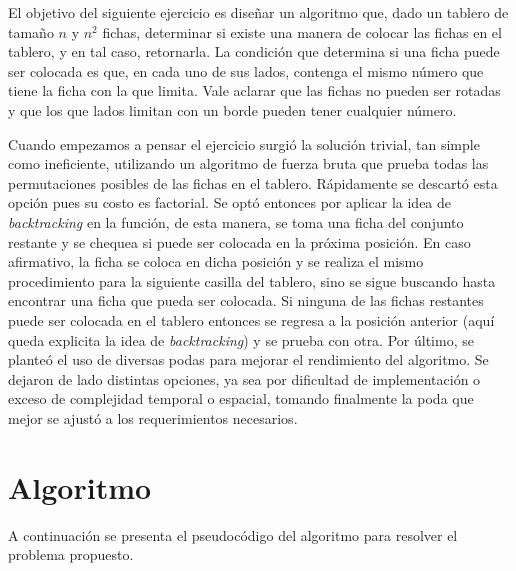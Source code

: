 \documentclass[a4paper,10pt] {article}
\begin{document}
El objetivo del siguiente ejercicio es dise\~{n}ar un algoritmo que, dado un tablero de tama\~{n}o $n$ y $n^{2}$ fichas, determinar si existe una manera de colocar las fichas en el tablero, y en tal caso, retornarla. La condici\'on que determina si una ficha puede ser colocada es que, en cada uno de sus lados, contenga el mismo n\'umero que tiene la ficha con la que limita. Vale aclarar que las fichas no pueden ser rotadas y que los que lados limitan con un borde pueden tener cualquier n\'umero.

Cuando empezamos a pensar el ejercicio surgi\'o la soluci\'on trivial, tan simple como ineficiente, utilizando un algoritmo de fuerza bruta que prueba todas las permutaciones posibles de las fichas en el tablero. R\'apidamente se descart\'o esta opci\'on pues su costo es factorial. Se opt\'o entonces por aplicar la idea de \textit{backtracking} en la funci\'on, de esta manera, se toma una ficha del conjunto restante y se chequea si puede ser colocada en la pr\'oxima posici\'on. En caso afirmativo, la ficha se coloca en dicha posici\'on y se realiza el mismo procedimiento para la siguiente casilla del tablero, sino se sigue buscando hasta encontrar una ficha que pueda ser colocada. Si ninguna de las fichas restantes puede ser colocada en el tablero entonces se regresa a la posici\'on anterior (aqu\'i queda explicita la idea de \textit{backtracking}) y se prueba con otra. Por \'ultimo, se plante\'o el uso de diversas podas para mejorar el rendimiento del algoritmo. Se dejaron de lado distintas opciones, ya sea por dificultad de implementaci\'on o exceso de complejidad temporal o espacial, tomando finalmente la poda que mejor se ajust\'o a los requerimientos necesarios.

\section*{Algoritmo}

A continuaci\'on se presenta el pseudoc\'odigo del algoritmo para resolver el problema propuesto.
\end{document}
